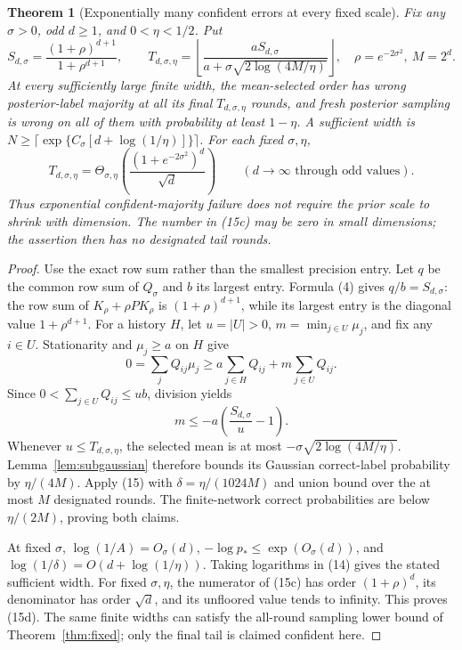 \documentclass[11pt]{article}
\newtheorem{theorem}{Theorem}
\begin{document}
\begin{theorem}[Exponentially many confident errors at every fixed scale]
\label{thm:fixed-confident}
Fix any $\sigma>0$, odd $d\ge1$, and $0<\eta<1/2$. Put
\[
 S_{d,\sigma}=\frac{(1+\rho)^{d+1}}{1+\rho^{d+1}},\qquad
 T_{d,\sigma,\eta}=\left\lfloor
 \frac{a S_{d,\sigma}}{a+\sigma\sqrt{2\log(4M/\eta)}}
                         \right\rfloor,
 \quad \rho=e^{-2\sigma^2},\ M=2^d.                    \tag{15c}
\]
At every sufficiently large finite width, the mean-selected order
has wrong posterior-label majority at all its final $T_{d,\sigma,\eta}$
rounds, and fresh posterior sampling is wrong on all of them with
probability at least $1-\eta$. A sufficient width is
$N\ge\lceil\exp\{C_\sigma[d+\log(1/\eta)]\}\rceil$.
For each fixed $\sigma,\eta$,
\[
 T_{d,\sigma,\eta}
       =\Theta_{\sigma,\eta}\left(
               \frac{(1+e^{-2\sigma^2})^d}{\sqrt d}\right)
               \qquad(d\to\infty\text{ through odd values}).   \tag{15d}
\]
Thus exponential confident-majority failure does not require the prior
scale to shrink with dimension. The number in (15c) may be zero in
small dimensions; the assertion then has no designated tail rounds.
\end{theorem}
\begin{proof}
Use the exact row sum rather than the smallest precision entry.
Let $q$ be the common row sum of $Q_\sigma$ and $b$ its largest
entry. Formula (4) gives $q/b=S_{d,\sigma}$: the row sum of
$K_\rho+\rho P K_\rho$ is $(1+\rho)^{d+1}$, while its largest
entry is the diagonal value $1+\rho^{d+1}$.
For a history $H$, let $u=|U|>0$, $m=\min_{j\in U}\mu_j$,
and fix any $i\in U$. Stationarity and $\mu_j\ge a$ on $H$ give
\[
 0=\sum_jQ_{ij}\mu_j
   \ge a\sum_{j\in H}Q_{ij}+m\sum_{j\in U}Q_{ij}.
\]
Since $0<\sum_{j\in U}Q_{ij}\le ub$, division yields
\[
                   m\le-a\left(\frac{S_{d,\sigma}}u-1\right).
                                                               \tag{15e}
\]
Whenever $u\le T_{d,\sigma,\eta}$, the selected mean is at most
$-\sigma\sqrt{2\log(4M/\eta)}$. Lemma~\ref{lem:subgaussian}
therefore bounds its Gaussian correct-label probability by
$\eta/(4M)$. Apply (15) with $\delta=\eta/(1024M)$ and union bound
over the at most $M$ designated rounds. The finite-network correct
probabilities are below $\eta/(2M)$, proving both claims.

At fixed $\sigma$, $\log(1/A)=O_\sigma(d)$,
$-\log p_*\le\exp(O_\sigma(d))$, and
$\log(1/\delta)=O(d+\log(1/\eta))$. Taking logarithms in (14)
gives the stated sufficient width. For fixed $\sigma,\eta$, the
numerator of (15c) has order $(1+\rho)^d$, its denominator has order
$\sqrt d$, and its unfloored value tends to infinity. This proves (15d).
The same finite widths can satisfy the all-round sampling lower bound
of Theorem~\ref{thm:fixed}; only the final tail is claimed confident here.
\end{proof}
\end{document}
